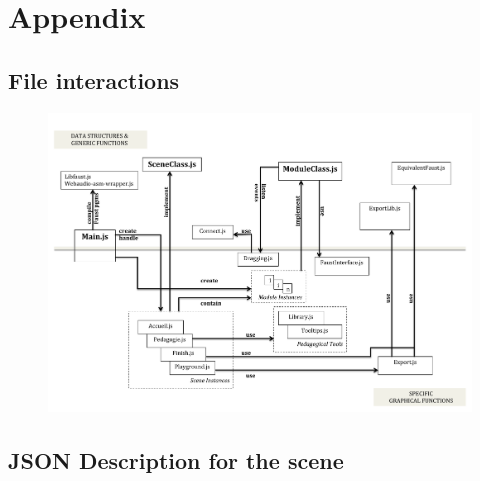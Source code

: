 \documentclass[a4paper]{article}
\begin{document}
\newpage
\section{Appendix}
\subsection{File interactions}
\begin{figure}[!h]
\begin{center}
\includegraphics[width=\columnwidth]{images/ClassDiagram.pdf}
\label{fig:classes}
\end{center}
\end{figure}

\newpage
\subsection{JSON Description for the scene}
\end{document}
